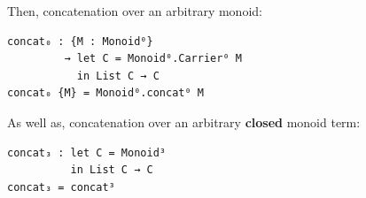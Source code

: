 \documentclass[sigplan,screen]{acmart}
\begin{document}
\begin{appendices}
\noindent
Then, concatenation over an arbitrary monoid:
\begin{verbatim}
concat₀ : {M : Monoid⁰}
         → let C = Monoid⁰.Carrier⁰ M
           in List C → C
concat₀ {M} = Monoid⁰.concat⁰ M
\end{verbatim}

\noindent
As well as, concatenation over an arbitrary \textbf{closed} monoid term:
\begin{verbatim}
concat₃ : let C = Monoid³
          in List C → C
concat₃ = concat³
\end{verbatim}

\end{appendices}
\end{document}
